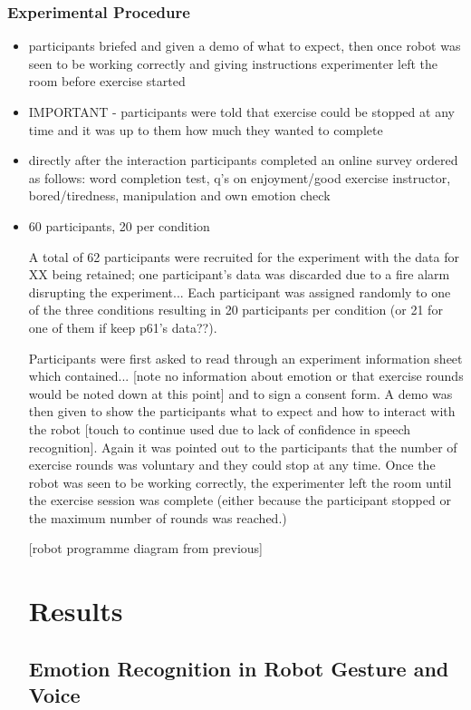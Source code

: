 \documentclass[11pt,a4paper]{report}
\begin{document}
\subsection{Experimental Procedure}
\begin{itemize}
	\item participants briefed and given a demo of what to expect, then once robot was seen to be working correctly and giving instructions experimenter left the room before exercise started
	\item IMPORTANT - participants were told that exercise could be stopped at any time and it was up to them how much they wanted to complete
	\item directly after the interaction participants completed an online survey ordered as follows: word completion test, q's on enjoyment/good exercise instructor, bored/tiredness, manipulation and own emotion check
	\item 60 participants, 20 per condition
	
A total of 62 participants were recruited for the experiment with the data for XX being retained; one participant's data was discarded due to a fire alarm disrupting the experiment... Each participant was assigned randomly to one of the three conditions resulting in 20 participants per condition (or 21 for one of them if keep p61's data??).  

Participants were first asked to read through an experiment information sheet which contained... [note no information about emotion or that exercise rounds would be noted down at this point] and to sign a consent form. A demo was then given to show the participants what to expect and how to interact with the robot [touch to continue used due to lack of confidence in speech recognition]. Again it was pointed out to the participants that the number of exercise rounds was voluntary and they could stop at any time. Once the robot was seen to be working correctly, the experimenter left the room until the exercise session was complete (either because the participant stopped or the maximum number of rounds was reached.)

[robot programme diagram from previous]

\chapter{Results}

\section{Emotion Recognition in Robot Gesture and Voice}

\end{itemize}
\end{document}
